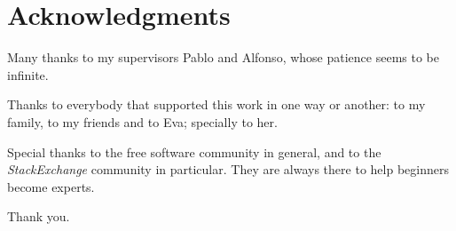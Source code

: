 
\bigskip

\begingroup
\let\clearpage\relax
\let\cleardoublepage\relax
\let\cleardoublepage\relax
\chapter*{Acknowledgments}

Many thanks to my supervisors Pablo and Alfonso, whose patience seems to be infinite.

Thanks to everybody that supported this work in one way or another: to my family, to my friends and to Eva; specially to her.

Special thanks to the free software community in general, and to the \emph{StackExchange} community in particular. They are always there to help beginners become experts.

Thank you.

\endgroup



